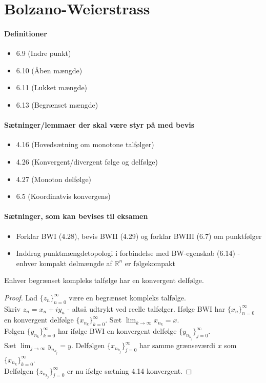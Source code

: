 \chapter{Bolzano-Weierstrass}
\subsubsection{Definitioner}
\begin{itemize}
\setlength\itemsep{0em}
\item 6.9 (Indre punkt)
\item 6.10 (Åben mængde)
\item 6.11 (Lukket mængde)
\item 6.13 (Begrænset mængde)
\end{itemize}
\subsubsection{Sætninger/lemmaer der skal være styr på med bevis}
\begin{itemize}
\setlength\itemsep{0em}
\item 4.16 (Hovedsætning om monotone talfølger)
\item 4.26 (Konvergent/divergent følge og delfølge)
\item 4.27 (Monoton delfølge)
\item 6.5 (Koordinatvis konvergens)
\end{itemize}
\subsubsection{Sætninger, som kan bevises til eksamen}
\begin{itemize}
\setlength\itemsep{0em}
\item Forklar BWI (4.28), bevis BWII (4.29) og forklar BWIII (6.7) om punktfølger
\item Inddrag punktmængdetopologi i forbindelse med BW-egenskab (6.14) - enhver kompakt delmængde af $\mathbb{R}^n$ er følgekompakt
\end{itemize}
\begin{theorem}
Enhver begrænset kompleks talfølge har en konvergent delfølge.
\end{theorem}
\begin{proof}
Lad $\{z_n\}_{n=0}^\infty$ være en begrænset kompleks talfølge.\\
Skriv $z_n=x_n+iy_n$ - altså udtrykt ved reelle talfølger. Ifølge BWI har $\{x_n\}_{n=0}^\infty$ en konvergent delfølge $\{x_{n_k}\}_{k=0}^\infty$. Sæt $\lim_{k\to\infty}x_{n_k}=x$.\\
Følgen $\{y_{n_k}\}_{k=0}^\infty$ har ifølge BWI en konvergent delfølge $\{y_{n_{k_j}}\}_{j=0}^\infty$.\\
Sæt $\lim_{j\to\infty}y_{n_{k_j}}=y$.
Delfølgen $\{x_{n_{k_j}}\}_{j=0}^\infty$ har samme grænseværdi $x$ som $\{x_{n_k}\}_{k=0}^\infty$.\\
Delfølgen $\{z_{n_{k_j}}\}_{j=0}^\infty$ er nu ifølge sætning 4.14 konvergent.
\end{proof}
\clearpage
